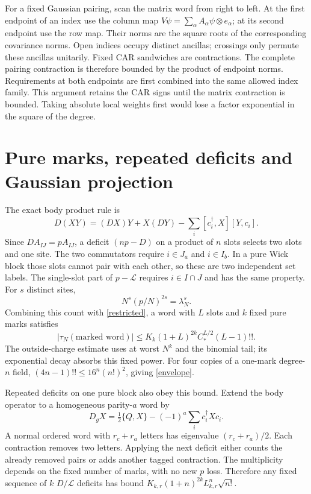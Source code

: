\documentclass[11pt]{article}
\newcommand{\LL}{\mathcal L}
\begin{document}
For a fixed Gaussian pairing, scan the matrix word from right to left.
At the first endpoint of an index use the column map
$V\psi=\sum_\alpha A_\alpha\psi\otimes e_\alpha$; at its second
endpoint use the row map. Their norms are the square roots of the
corresponding covariance norms. Open indices occupy distinct ancillas;
crossings only permute these ancillas unitarily. Fixed CAR sandwiches
are contractions. The complete pairing contraction is therefore
bounded by the product of endpoint norms. Requirements at both
endpoints are first combined into the same allowed index family.
This argument retains the CAR signs until the matrix contraction is
bounded. Taking absolute local weights first would lose a factor
exponential in the square of the degree.

\newpage
\section{Pure marks, repeated deficits and Gaussian projection}
The exact body product rule is
\begin{equation}
 D(XY)=(DX)Y+X(DY)-\sum_i[c_i^\dagger,X][Y,c_i].
\end{equation}
Since $DA_{IJ}=pA_{IJ}$, a deficit $(np-D)$ on a product of $n$
slots selects two slots and one site. The two commutators require
$i\in J_a$ and $i\in I_b$. In a pure Wick block those slots cannot
pair with each other, so these are two independent set labels.
The single-slot part of $p-\LL$ requires $i\in I\cap J$ and has
the same property. For $s$ distinct sites,
\begin{equation}
 N^s(p/N)^{2s}=\lambda_N^s.
\end{equation}
Combining this count with \eqref{restricted}, a word with $L$ slots
and $k$ fixed pure marks satisfies
\begin{equation}\label{word}
 |\tau_N(\text{marked word})|
 \le K_k(1+L)^{2k}C_*^{L/2}(L-1)!!.
\end{equation}
The outside-charge estimate uses at worst $N^k$ and the binomial
tail; its exponential decay absorbs this fixed power. For four
copies of a one-mark degree-$n$ field,
$(4n-1)!!\le16^n(n!)^2$, giving \eqref{envelope}.

Repeated deficits on one pure block also obey this bound. Extend
the body operator to a homogeneous parity-$a$ word by
\begin{equation}
 D_gX=\tfrac12\{Q,X\}-(-1)^a\sum_i c_i^\dagger Xc_i.
\end{equation}
A normal ordered word with $r_c+r_a$ letters has eigenvalue
$(r_c+r_a)/2$. Each contraction removes two letters. Applying the
next deficit either counts the already removed pairs or adds another
tagged contraction. The multiplicity depends on the fixed number of
marks, with no new $p$ loss. Therefore any fixed sequence of $k$
$D/\LL$ deficits has bound
$K_{k,r}(1+n)^{2k}L_{k,r}^n\sqrt{n!}$.
\end{document}
